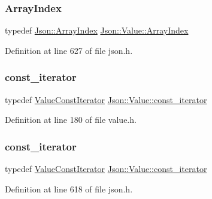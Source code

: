 \subsubsection{\texorpdfstring{Array\+Index}{ArrayIndex}\hspace{0.1cm}{\footnotesize\ttfamily [2/2]}}
{\footnotesize\ttfamily typedef \hyperlink{namespace_json_a8048e741f2177c3b5d9ede4a5b8c53c2}{Json\+::\+Array\+Index} \hyperlink{class_json_1_1_value_a184a91566cccca7b819240f0d5561c7d}{Json\+::\+Value\+::\+Array\+Index}}



Definition at line 627 of file json.\+h.

\hypertarget{class_json_1_1_value_af92282ca92b58b320debd486afb7696a}{}\label{class_json_1_1_value_af92282ca92b58b320debd486afb7696a} 
\subsubsection{\texorpdfstring{const\+\_\+iterator}{const\_iterator}\hspace{0.1cm}{\footnotesize\ttfamily [1/2]}}
{\footnotesize\ttfamily typedef \hyperlink{class_json_1_1_value_const_iterator}{Value\+Const\+Iterator} \hyperlink{class_json_1_1_value_af92282ca92b58b320debd486afb7696a}{Json\+::\+Value\+::const\+\_\+iterator}}



Definition at line 180 of file value.\+h.

\hypertarget{class_json_1_1_value_af92282ca92b58b320debd486afb7696a}{}\label{class_json_1_1_value_af92282ca92b58b320debd486afb7696a} 
\subsubsection{\texorpdfstring{const\+\_\+iterator}{const\_iterator}\hspace{0.1cm}{\footnotesize\ttfamily [2/2]}}
{\footnotesize\ttfamily typedef \hyperlink{class_json_1_1_value_const_iterator}{Value\+Const\+Iterator} \hyperlink{class_json_1_1_value_af92282ca92b58b320debd486afb7696a}{Json\+::\+Value\+::const\+\_\+iterator}}



Definition at line 618 of file json.\+h.

